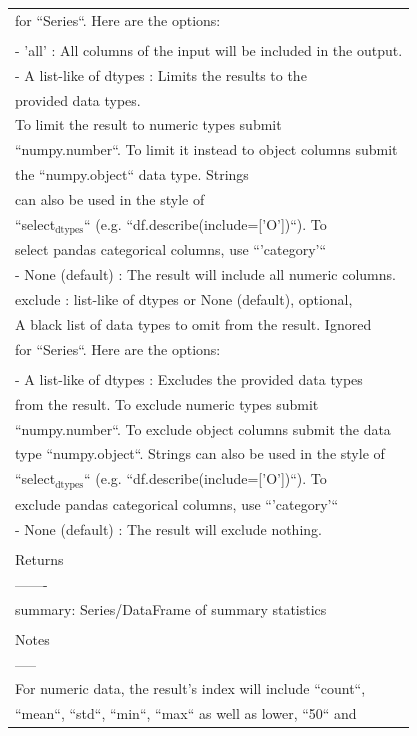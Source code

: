 \documentclass[11pt]{article}
\begin{document}
\begin{enumerate}
\begin{enumerate}
\begin{enumerate}
\begin{center}
\begin{tabular}{l}
for ``Series``. Here are the options:\\
\\
- 'all' : All columns of the input will be included in the output.\\
- A list-like of dtypes : Limits the results to the\\
provided data types.\\
To limit the result to numeric types submit\\
``numpy.number``. To limit it instead to object columns submit\\
the ``numpy.object`` data type. Strings\\
can also be used in the style of\\
``select\(_{\text{dtypes}}\)`` (e.g. ``df.describe(include=['O'])``). To\\
select pandas categorical columns, use ``'category'``\\
- None (default) : The result will include all numeric columns.\\
exclude : list-like of dtypes or None (default), optional,\\
A black list of data types to omit from the result. Ignored\\
for ``Series``. Here are the options:\\
\\
- A list-like of dtypes : Excludes the provided data types\\
from the result. To exclude numeric types submit\\
``numpy.number``. To exclude object columns submit the data\\
type ``numpy.object``. Strings can also be used in the style of\\
``select\(_{\text{dtypes}}\)`` (e.g. ``df.describe(include=['O'])``). To\\
exclude pandas categorical columns, use ``'category'``\\
- None (default) : The result will exclude nothing.\\
\\
Returns\\
-------\\
summary:  Series/DataFrame of summary statistics\\
\\
Notes\\
-----\\
For numeric data, the result's index will include ``count``,\\
``mean``, ``std``, ``min``, ``max`` as well as lower, ``50`` and\\

\end{tabular}
\end{center}
\end{enumerate}
\end{enumerate}
\end{enumerate}
\end{document}
